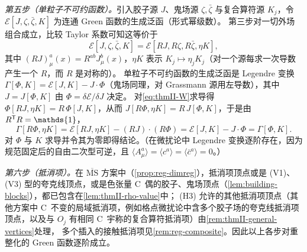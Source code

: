 \documentclass[UTF8,a4paper,11pt,fontset=fandol]{ctexart}
\makeatletter
\let\amsmathbb\mathbb
\renewcommand{\mathbb}[1]{\ifx1#1\mathds{1}\else\amsmathbb{#1}\fi}
\theoremstyle{cplain}
\theoremstyle{cdefinition}
\theoremstyle{cremark}
\renewcommand{\proofname}{证明}
\renewenvironment{proof}[1][\proofname]{\par\pushQED{\qed}\normalfont\topsep6\p@\@plus6\p@\relax
  \trivlist\item[\hskip\labelsep\itshape #1\hspace{0.5em}]\ignorespaces}{\popQED\endtrivlist\@endpefalse}
\numberwithin{equation}{section}
\newcommand{\tp}{\mathsf{T}}                         %
\makeatother
\begin{document}
\begin{proof}
\emph{第五步（单粒子不可约函数）。}引入胶子源 $J$、鬼场源 $\zeta,\bar\zeta$ 与复合算符源 $K_j$，令 $\mathcal E[J,\zeta,\bar\zeta,K]$ 为连通 Green 函数的生成泛函（形式幂级数）。
第三步对一切外场组合成立，比较 Taylor 系数可知这等价于
\begin{equation}\label{eq:thmII-W}
\mathcal E[J,\zeta,\bar\zeta,K]=\mathcal E[RJ,R\zeta,R\bar\zeta,\eta K],
\end{equation}
其中 $(RJ)^a_\mu(x)=R^{ab}J^b_\mu(x)$，$\eta K$ 表示 $K_j\mapsto\eta_jK_j$（对一个源每求一次导数产生一个 $R$，而 $R$ 是对称的）。
单粒子不可约函数的生成泛函是 Legendre 变换 $\Gamma[\Phi,K]=\mathcal E[J,K]-J\cdot\Phi$（鬼场同理，对 Grassmann 源用左导数），其中 $J=J[\Phi,K]$ 由 $\Phi=\delta\mathcal E/\delta J$ 决定。
对\cref{eq:thmII-W}求导得 $\Phi[RJ,\eta K]=R\,\Phi[J,K]$，从而 $J[R\Phi,\eta K]=R\,J[\Phi,K]$，于是由 $R^{\tp}R=\mathbb 1$，
\[
\Gamma[R\Phi,\eta K]=\mathcal E[RJ,\eta K]-(RJ)\cdot(R\Phi)=\mathcal E[J,K]-J\cdot\Phi=\Gamma[\Phi,K].
\]
对 $\Phi$ 与 $K$ 求导并令其为零即得结论。（在微扰论中 Legendre 变换逐阶存在，因为规范固定后的自由二次型可逆，且 $\langle A^a_\mu\rangle=\langle c^a\rangle=\langle\bar c^a\rangle=0$。）

\emph{第六步（抵消项）。}在 $\overline{\mathrm{MS}}$ 方案中（\cref{prop:reg-dimreg}），抵消项顶点或是 (V1)、(V3) 型的夸克线顶点，或是色张量 C~偶的胶子、鬼场顶点（\cref{lem:building-blocks}），都已包含在\cref{lem:thmII-rho-value}中；
(H3) 允许的其他抵消项顶点（其他方案中 C~不变的局域抵消项，例如格点微扰论中含多个胶子场的夸克线抵消项顶点，以及与 $O_j$ 有相同 C~宇称的复合算符抵消项）由\cref{rem:thmII-general-vertices}处理，
多个插入的接触抵消项见\cref{rem:reg-composite}。因此以上各步对重整化的 Green 函数逐阶成立。
\end{proof}
\end{document}

